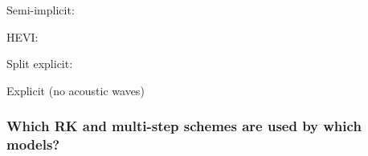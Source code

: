 Semi-implicit: 

HEVI: 

Split explicit: 

Explicit (no acoustic waves) 

\subsubsection*{Which RK and multi-step schemes are used by which models?}

\clearpage{}

\nocite{WLW13}

\nocite{GKC13}
